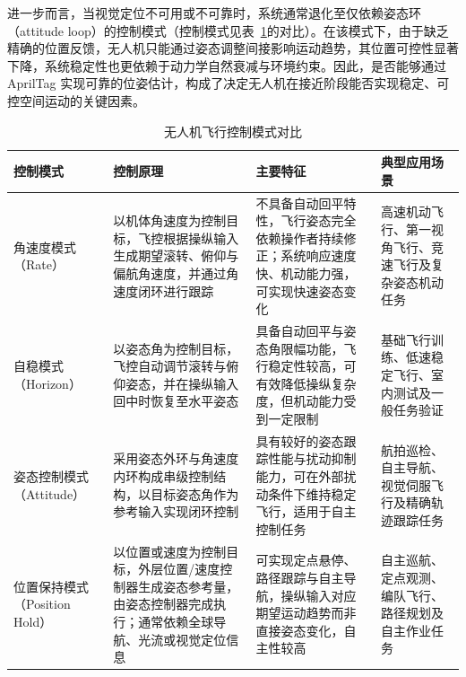 进一步而言，当视觉定位不可用或不可靠时，系统通常退化至仅依赖姿态环（attitude loop）的控制模式（控制模式见表~\ref{tab:flight_modes}的对比）。在该模式下，由于缺乏精确的位置反馈，无人机只能通过姿态调整间接影响运动趋势，其位置可控性显著下降，系统稳定性也更依赖于动力学自然衰减与环境约束。因此，是否能够通过 AprilTag 实现可靠的位姿估计，构成了决定无人机在接近阶段能否实现稳定、可控空间运动的关键因素。

\begin{table}[htbp]
\centering
\caption{无人机飞行控制模式对比}
\label{tab:flight_modes}
\renewcommand{\arraystretch}{1.3}

\begin{tabular}{p{}
p{}
p{}
p{}}
\toprule
\textbf{控制模式} & \textbf{控制原理} & \textbf{主要特征} & \textbf{典型应用场景} \\
\midrule

角速度模式（Rate）
&
以机体角速度为控制目标，飞控根据操纵输入生成期望滚转、俯仰与偏航角速度，并通过角速度闭环进行跟踪
&
不具备自动回平特性，飞行姿态完全依赖操作者持续修正；系统响应速度快、机动能力强，可实现快速姿态变化
&
高速机动飞行、第一视角飞行、竞速飞行及复杂姿态机动任务 \\

自稳模式（Horizon）
&
以姿态角为控制目标，飞控自动调节滚转与俯仰姿态，并在操纵输入回中时恢复至水平姿态
&
具备自动回平与姿态角限幅功能，飞行稳定性较高，可有效降低操纵复杂度，但机动能力受到一定限制
&
基础飞行训练、低速稳定飞行、室内测试及一般任务验证 \\

姿态控制模式（Attitude）
&
采用姿态外环与角速度内环构成串级控制结构，以目标姿态角作为参考输入实现闭环控制
&
具有较好的姿态跟踪性能与扰动抑制能力，可在外部扰动条件下维持稳定飞行，适用于自主控制任务
&
航拍巡检、自主导航、视觉伺服飞行及精确轨迹跟踪任务 \\

位置保持模式（Position Hold）
&
以位置或速度为控制目标，外层位置/速度控制器生成姿态参考量，由姿态控制器完成执行；通常依赖全球导航、光流或视觉定位信息
&
可实现定点悬停、路径跟踪与自主导航，操纵输入对应期望运动趋势而非直接姿态变化，自主性较高
&
自主巡航、定点观测、编队飞行、路径规划及自主作业任务 \\

\bottomrule
\end{tabular}
\end{table}

